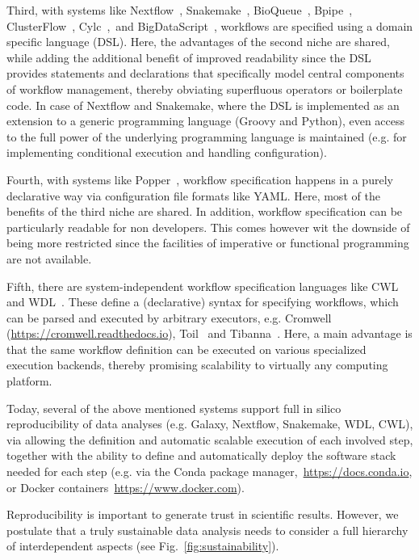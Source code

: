 \documentclass{scrartcl}
\let\plainurl\url
\renewcommand{\url}[1]{\protect\plainurl{#1}}
\begin{document}
Third, with systems like Nextflow~\parencite{Di_Tommaso_2017}, Snakemake~\parencite{Köster2012}, BioQueue~\parencite{Yao2017}, Bpipe~\parencite{Sadedin2012}, ClusterFlow~\parencite{Ewels2016}, Cylc~\parencite{J_Oliver_2018},~and BigDataScript~\parencite{Cingolani_2014}, workflows are specified using a domain specific language (DSL).
Here, the advantages of the second niche are shared, while adding the additional benefit of improved readability since the DSL provides statements and declarations that specifically model central components of workflow management, thereby obviating superfluous operators or boilerplate code.
In case of Nextflow and Snakemake, where the DSL is implemented as an extension to a generic programming language (Groovy and Python), even access to the full power of the underlying programming language is maintained (e.g. for implementing conditional execution and handling configuration).

Fourth, with systems like Popper~\parencite{Jimenez_2017}, workflow specification happens in a purely declarative way via configuration file formats like YAML.
Here, most of the benefits of the third niche are shared.
In addition, workflow specification can be particularly readable for non developers.
This comes however wit the downside of being more restricted since the facilities of imperative or functional programming are not available.

Fifth, there are system-independent workflow specification languages like CWL~\parencite{cwl} and WDL~\parencite{voss_full-stack_2017}.
These define a (declarative) syntax for specifying workflows, which can be parsed and executed by arbitrary executors, e.g. Cromwell (\url{https://cromwell.readthedocs.io}), Toil~\parencite{Vivian_2017} and Tibanna~\parencite{Lee_2019}.
Here, a main advantage is that the same workflow definition can be executed on various specialized execution backends, thereby promising scalability to virtually any computing platform.

Today, several of the above mentioned systems support full in silico reproducibility of data analyses (e.g. Galaxy, Nextflow, Snakemake, WDL, CWL), via allowing the definition and automatic scalable execution of each involved step, together with the ability to define and automatically deploy the software stack needed for each step (e.g. via the Conda package manager,~\url{https://docs.conda.io}, or Docker containers~\url{https://www.docker.com}).

Reproducibility is important to generate trust in scientific results.
However, we postulate that a truly sustainable data analysis needs to consider a full hierarchy of interdependent aspects (see Fig.~\ref{fig:sustainability}).
\end{document}
